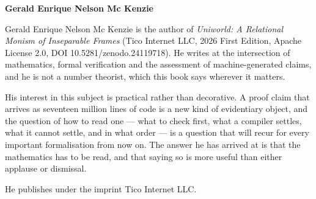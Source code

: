\noindent\textbf{Gerald Enrique Nelson Mc Kenzie}\par
\vspace{6pt}

\noindent\small
Gerald Enrique Nelson Mc Kenzie is the author of \emph{Uniworld: A Relational
Monism of Inseparable Frames} (Tico Internet LLC, 2026 First Edition, Apache
License 2.0, DOI 10.5281/zenodo.24119718). He writes at the intersection of
mathematics, formal verification and the assessment of machine-generated
claims, and he is not a number theorist, which this book says wherever it
matters.

His interest in this subject is practical rather than decorative. A proof
claim that arrives as seventeen million lines of code is a new kind of
evidentiary object, and the question of how to read one --- what to check
first, what a compiler settles, what it cannot settle, and in what order ---
is a question that will recur for every important formalisation from now on.
The answer he has arrived at is that the mathematics has to be read, and that
saying so is more useful than either applause or dismissal.

He publishes under the imprint Tico Internet LLC.

\vfill
\noindent{\sffamily\small\color{txtdim}\rule{\textwidth}{0.4pt}}\par
{}

